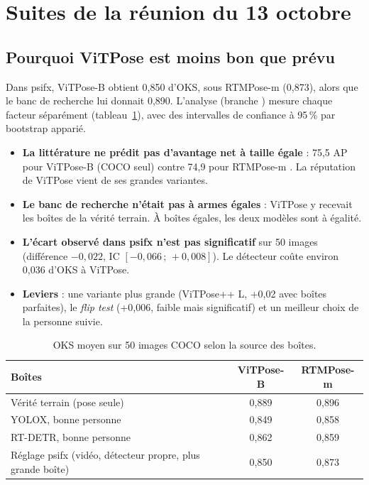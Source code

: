 \documentclass[11pt,a4paper]{report}
\newcommand{\code}[1]{\texttt{\detokenize{#1}}}
\begin{document}
\section{Suites de la réunion du 13 octobre}
\label{sec:phase2-reunion}

\subsection{Pourquoi ViTPose est moins bon que prévu}

Dans psifx, ViTPose-B obtient 0,850 d'OKS, sous RTMPose-m (0,873), alors que le banc de recherche lui donnait 0,890.
L'analyse (branche \code{analysis/vitpose-gap}) mesure chaque facteur séparément (tableau~\ref{tab:vitpose-gap}),
avec des intervalles de confiance à 95\,\% par bootstrap apparié.
\begin{itemize}
    \item \textbf{La littérature ne prédit pas d'avantage net à taille égale} : 75,5 AP pour ViTPose-B (COCO seul)
    contre 74,9 pour RTMPose-m \cite{xu2022vitpose,jiang2023rtmpose}. La réputation de ViTPose vient de ses grandes
    variantes.
    \item \textbf{Le banc de recherche n'était pas à armes égales} : ViTPose y recevait les boîtes de la vérité
    terrain. À boîtes égales, les deux modèles sont à égalité.
    \item \textbf{L'écart observé dans psifx n'est pas significatif} sur 50 images (différence $-0{,}022$, IC
    $[-0{,}066\,;\,+0{,}008]$). Le détecteur coûte environ 0,036 d'OKS à ViTPose.
    \item \textbf{Leviers} : une variante plus grande (ViTPose++ L, +0,02 avec boîtes parfaites), le \emph{flip test}
    (+0,006, faible mais significatif) et un meilleur choix de la personne suivie.
\end{itemize}

\begin{table}[H]
\centering
\caption{OKS moyen sur 50 images COCO selon la source des boîtes.}
\label{tab:vitpose-gap}
\small
\begin{tabular}{@{}lcc@{}}
\toprule
Boîtes & ViTPose-B & RTMPose-m \\
\midrule
Vérité terrain (pose seule) & 0,889 & 0,896 \\
YOLOX, bonne personne & 0,849 & 0,858 \\
RT-DETR, bonne personne & 0,862 & 0,859 \\
Réglage psifx (vidéo, détecteur propre, plus grande boîte) & 0,850 & 0,873 \\
\bottomrule
\end{tabular}
\end{table}
\end{document}
